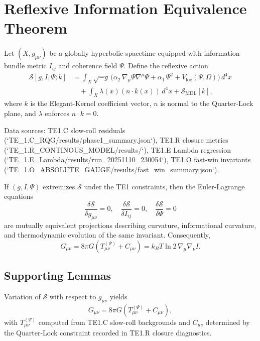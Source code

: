 \section{Reflexive Information Equivalence Theorem}

Let $(X, g_{\mu\nu})$ be a globally hyperbolic spacetime equipped with information bundle metric $I_{ij}$ and coherence field $\Psi$. Define the reflexive action
\begin{align}
\mathcal{S}[g, I, \Psi; k] &= \int_X \sqrt{-g} \, \Big( \alpha_2 \, \nabla_\mu \Psi \nabla^\mu \Psi + \alpha_1 \, \Psi^2 + V_{\text{loc}}(\Psi, \Omega) \Big) \, d^4x \\
&\quad + \int_X \lambda(x) (n \cdot k(x)) \, d^4x + \mathcal{S}_{\text{MDL}}[k],
\end{align}
where $k$ is the Elegant-Kernel coefficient vector, $n$ is normal to the Quarter-Lock plane, and $\lambda$ enforces $n \cdot k = 0$.

Data sources: TE1.C slow-roll residuals (`TE_1.C_RQG/results/phase1_summary.json`), TE1.R closure metrics (`TE_1.R_CONTINOUS_MODEL/results/`), TE1.E Lambda regression (`TE_1.E_Lambda/results/run_20251110_230054`), TE1.O fast-win invariants (`TE_1.O_ABSOLUTE_GAUGE/results/fast_win_summary.json`).

\begin{theorem}[RIET]
If $(g, I, \Psi)$ extremizes $\mathcal{S}$ under the TE1 constraints, then the Euler-Lagrange equations
\[\frac{\delta \mathcal{S}}{\delta g_{\mu\nu}}=0,\quad \frac{\delta \mathcal{S}}{\delta I_{ij}}=0,\quad \frac{\delta \mathcal{S}}{\delta \Psi}=0\]
are mutually equivalent projections describing curvature, informational curvature, and thermodynamic evolution of the same invariant. Consequently,
\[G_{\mu\nu} = 8 \pi G \left(T^{(\Psi)}_{\mu\nu} + C_{\mu\nu}\right) = k_B T \ln 2 \, \nabla_\mu \nabla_\nu I.\]
\end{theorem}

\subsection{Supporting Lemmas}

\begin{lemma}
Variation of $\mathcal{S}$ with respect to $g_{\mu\nu}$ yields
\[G_{\mu\nu} = 8 \pi G \left(T^{(\Psi)}_{\mu\nu} + C_{\mu\nu}\right),\]
with $T^{(\Psi)}_{\mu\nu}$ computed from TE1.C slow-roll backgrounds and $C_{\mu\nu}$ determined by the Quarter-Lock constraint recorded in TE1.R closure diagnostics.
\end{lemma}

